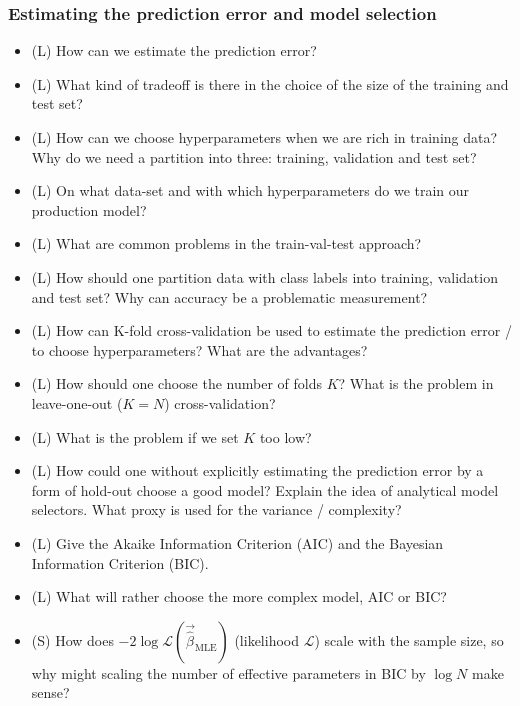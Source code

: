 \subsubsection*{Estimating the prediction error and model selection}
\begin{itemize}
    \item (L) How can we estimate the prediction error?
    \answerboxM
    \item (L) What kind of tradeoff is there in the choice of the size of the training and test set?
    \answerboxM
    \item (L) How can we choose hyperparameters when we are rich in training data? Why do we need a
    partition into three: training, validation and test set?
    \answerboxM
    \item (L) On what data-set and with which hyperparameters do we train our production model?
    \answerboxM
    \item (L) What are common problems in the train-val-test approach?
    \answerboxM
    \item (L) How should one partition data with class labels into training, validation and test set? Why can accuracy be a problematic measurement?
    \answerboxM
    \item (L) How can K-fold cross-validation be used to estimate the prediction error / to choose hyperparameters? What are the advantages?
    \answerboxM
    \item (L) How should one choose the number of folds $K$? What is the problem in leave-one-out ($K=N$) cross-validation?
    \answerboxM
    \item (L) What is the problem if we set $K$ too low?
    \answerboxM
    \item (L) How could one without explicitly estimating the prediction error by a form of hold-out
    choose a good model? Explain the idea of analytical model selectors. What proxy is used for 
    the variance / complexity?
    \answerboxM
    \item (L) Give the Akaike Information Criterion (AIC) and the Bayesian Information Criterion (BIC).
    \answerboxM
    \item (L) What will rather choose the more complex model, AIC or BIC?
    \answerboxM
    \item (S) How does $-2\log \mathcal{L}(\vec{\hat{\beta}}_\text{MLE})$ (likelihood $\mathcal{L}$) scale
    with the sample size, so why might scaling the number of effective parameters in BIC by $\log N$ make sense?
    \answerboxS
\end{itemize}

